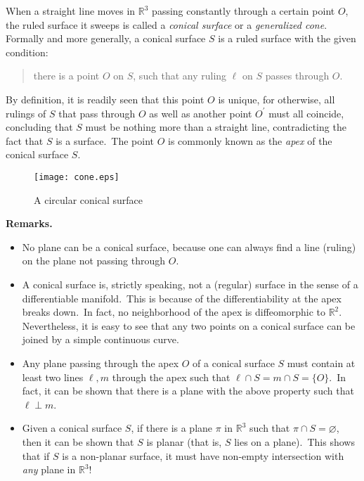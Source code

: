 \documentclass[12pt]{article}
\theoremstyle{definition}
\begin{document}
When a straight line moves in $\mathbb{R}^3$ passing constantly through a certain point $O$, the ruled surface it sweeps is called a {\em conical surface} or a {\em generalized cone}.\, Formally and more generally, a conical surface $S$ is a ruled surface with the given condition: 
\begin{quote}
there is a point $O$ on $S$, such that any ruling $\ell$ on $S$ passes through $O$.
\end{quote}

By definition, it is readily seen that this point $O$ is unique, for otherwise, all rulings of $S$ that pass through $O$ as well as another point $O^{\prime}$ must all coincide, concluding that $S$ must be nothing more than a straight line, contradicting the fact that $S$ is a surface.\, The point $O$ is commonly known as the \emph{apex} of the conical surface $S$.\\

\begin{figure}
\begin{center}
\texttt{[image: cone.eps]}
\end{center}
\caption{A circular conical surface}
\end{figure}

\textbf{Remarks.}
\begin{itemize}
\item No plane can be a conical surface, because one can always find a line (ruling) on the plane not passing through $O$.
\item A conical surface is, strictly speaking, not a (regular) surface in the sense of a differentiable manifold.\, This is because of the differentiability at the apex breaks down.\, In fact, no neighborhood of the apex is diffeomorphic to $\mathbb{R}^2$.\, Nevertheless, it is easy to see that any two points on a conical surface can be joined by a simple continuous curve.
\item Any plane passing through the apex $O$ of a conical surface $S$ must contain at least two lines $\ell,m$ through the apex such that $\ell\cap S=m\cap S=\lbrace O\rbrace$.\, In fact, it can be shown that there is a plane with the above property such that $\ell\perp m$.
\item Given a conical surface $S$, if there is a plane $\pi$ in $\mathbb{R}^3$ such that $\pi\cap S=\varnothing$, then it can be shown that $S$ is planar (that is, $S$ lies on a plane).\, This shows that if $S$ is a non-planar surface, it must have non-empty intersection with \emph{any} plane in $\mathbb{R}^3$!
\end{itemize}
\end{document}
